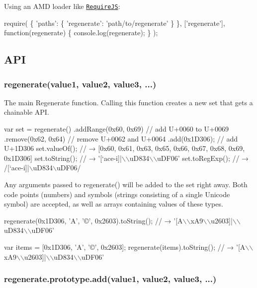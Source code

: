 Using an A\+MD loader like \href{http://requirejs.org/}{\tt Require\+JS}\+:


\begin{DoxyCode}
require(
  \{
    'paths': \{
      'regenerate': 'path/to/regenerate'
    \}
  \},
  ['regenerate'],
  function(regenerate) \{
    console.log(regenerate);
  \}
);
\end{DoxyCode}


\subsection*{A\+PI}

\subsubsection*{{\ttfamily regenerate(value1, value2, value3, ...)}}

The main Regenerate function. Calling this function creates a new set that gets a chainable A\+PI.


\begin{DoxyCode}
var set = regenerate()
  .addRange(0x60, 0x69) // add U+0060 to U+0069
  .remove(0x62, 0x64) // remove U+0062 and U+0064
  .add(0x1D306); // add U+1D306
set.valueOf();
// → [0x60, 0x61, 0x63, 0x65, 0x66, 0x67, 0x68, 0x69, 0x1D306]
set.toString();
// → '[`ace-i]|\(\backslash\)\(\backslash\)uD834\(\backslash\)\(\backslash\)uDF06'
set.toRegExp();
// → /[`ace-i]|\(\backslash\)uD834\(\backslash\)uDF06/
\end{DoxyCode}


Any arguments passed to {\ttfamily regenerate()} will be added to the set right away. Both code points (numbers) and symbols (strings consisting of a single Unicode symbol) are accepted, as well as arrays containing values of these types.


\begin{DoxyCode}
regenerate(0x1D306, 'A', '©', 0x2603).toString();
// → '[A\(\backslash\)\(\backslash\)xA9\(\backslash\)\(\backslash\)u2603]|\(\backslash\)\(\backslash\)uD834\(\backslash\)\(\backslash\)uDF06'

var items = [0x1D306, 'A', '©', 0x2603];
regenerate(items).toString();
// → '[A\(\backslash\)\(\backslash\)xA9\(\backslash\)\(\backslash\)u2603]|\(\backslash\)\(\backslash\)uD834\(\backslash\)\(\backslash\)uDF06'
\end{DoxyCode}


\subsubsection*{{\ttfamily regenerate.\+prototype.\+add(value1, value2, value3, ...)}}

